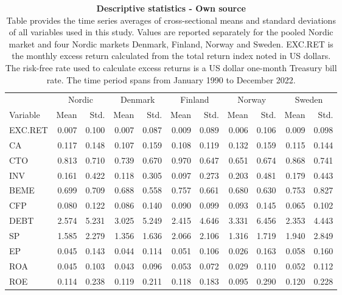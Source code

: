 \documentclass[12pt]{article}
\begin{document}
\begin{table}[ht] 
\footnotesize
\caption[Descriptive statistics]{\textbf{Descriptive statistics \textnormal{- Own source}}\\ Table provides the time series averages of cross-sectional means and standard deviations of all variables used in this study. Values are reported separately for the pooled Nordic market and four Nordic markets Denmark, Finland, Norway and Sweden. EXC.RET is the monthly excess return calculated from the total return index noted in US dollars. The risk-free rate used to calculate excess returns is a US dollar one-month Treasury bill rate. The time period spans from January 1990 to December 2022.}
 \label{table:DescriptiveStatistics}
\centering
\begin{tabularx}{\textwidth}{@{\extracolsep{1pt}} X r r r r r r r r r r} 
\toprule
 & \multicolumn{2}{c}{Nordic} & \multicolumn{2}{c}{Denmark} & \multicolumn{2}{c}{Finland} & \multicolumn{2}{c}{Norway}&\multicolumn{2}{c}{Sweden} \\
\cmidrule{2-3}\cmidrule{4-5}\cmidrule{6-7}\cmidrule{8-9}\cmidrule{10-11}
Variable 		& Mean 	& Std. 	& Mean 	& Std. 	& Mean 	& Std. 	& Mean 	& Std. 	& Mean 	& Std. \\
\midrule
EXC.RET		& 0.007 	& 0.100	& 0.007 	& 0.087	& 0.009	& 0.089	& 0.006	& 0.106	& 0.009	& 0.098 \\
CA		 	& 0.117 	& 0.148	& 0.107 	& 0.159	& 0.108	& 0.119	& 0.132	& 0.159	& 0.115	& 0.144 \\
CTO		 	& 0.813  	& 0.710 	& 0.739 	& 0.670	& 0.970	& 0.647	& 0.651	& 0.674	& 0.868	& 0.741 \\
INV 			& 0.161 	& 0.422	& 0.118 	& 0.305	& 0.097	& 0.273	& 0.203	& 0.481	& 0.179	& 0.443 \\
BEME	 	& 0.699 	& 0.709	& 0.688 	& 0.558	& 0.757	& 0.661	& 0.680	& 0.630	& 0.753	& 0.827 \\
CFP	 		& 0.080 	& 0.122	& 0.086 	& 0.140	& 0.090	& 0.099	& 0.093	& 0.145	& 0.065	& 0.102 \\
DEBT	 	& 2.574 	& 5.231	& 3.025 	& 5.249	& 2.415	& 4.646	& 3.331	& 6.456	& 2.353	& 4.443 \\
SP 			& 1.585	& 2.279	& 1.356 	& 1.636	& 2.066	& 2.106	& 1.316	& 1.719	& 1.940	& 2.849 \\
EP 			& 0.045	& 0.143	& 0.044 	& 0.114	& 0.051	& 0.106	& 0.026	& 0.163	& 0.058	& 0.160 \\
ROA 		& 0.045	& 0.103	& 0.043 	& 0.096	& 0.053	& 0.072	& 0.029	& 0.110	& 0.052	& 0.112 \\
ROE 		& 0.114 	& 0.238	& 0.119 	& 0.211	& 0.118	& 0.183	& 0.095	& 0.290	& 0.120	& 0.228 \\

\end{tabularx}
\end{table}
\end{document}
